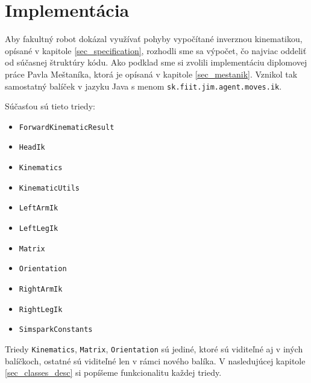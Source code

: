 \section{Implementácia} \label{sec_implementation}

Aby fakultný robot dokázal využívať pohyby vypočítané inverznou kinematikou, opísané v kapitole \ref{sec_specification}, rozhodli sme sa výpočet, čo najviac oddeliť od súčasnej štruktúry kódu. Ako podklad sme si zvolili implementáciu diplomovej práce Pavla Meštaníka, ktorá je opísaná v kapitole \ref{sec_mestanik}. Vznikol tak samostatný balíček v jazyku Java s menom \texttt{sk.fiit.jim.agent.moves.ik}. 

Súčasťou sú tieto triedy:
\begin{itemize}
	\item \texttt{ForwardKinematicResult}
	\item \texttt{HeadIk}
	\item \texttt{Kinematics}
	\item \texttt{KinematicUtils}
	\item \texttt{LeftArmIk}
	\item \texttt{LeftLegIk}
	\item \texttt{Matrix}
	\item \texttt{Orientation}
	\item \texttt{RightArmIk}
	\item \texttt{RightLegIk}
	\item \texttt{SimsparkConstants}
\end{itemize}

Triedy \texttt{Kinematics}, \texttt{Matrix}, \texttt{Orientation} sú jediné, ktoré sú viditeľné aj v iných balíčkoch, ostatné sú viditeľné len v rámci nového balíka. V nasledujúcej kapitole \ref{sec_classes_desc} si popíšeme funkcionalitu každej triedy.

